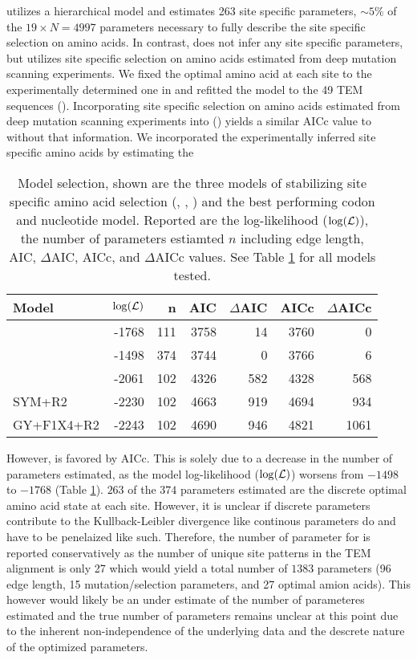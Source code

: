 \selac utilizes a hierarchical model and estimates 263 site specific parameters, $\sim5\%$ of the $19\times N = 4997$ parameters necessary to fully describe the site specific selection on amino acids.
In contrast, \phydms does not infer any site specific parameters, but utilizes site specific selection on amino acids estimated from deep mutation scanning experiments.
We fixed the optimal amino acid at each site to the experimentally determined one in \selac and refitted the model to the 49 TEM sequences (\selacDMS).
Incorporating site specific selection on amino acids estimated from deep mutation scanning experiments into \selac (\selacDMS) yields a similar AICc value to \selac without that information.
We incorporated the experimentally inferred site specific amino acids by estimating the 

\begin{table}
  \centering
  \begin{tabular}{lrrrrrr}
    Model		& $\log(\mathcal{L})$ & n & AIC & $\Delta$AIC & AICc & $\Delta$AICc\\ \hline 
    \selacDMS 		& -1768 & 111& 3758& 14	& 3760  & 0\\
    \selac		& -1498 & 374& 3744&  0	& 3766  & 6 \\
    \phydms 		& -2061 & 102& 4326& 582& 4328 & 568\\
    SYM+R2 		& -2230 & 102& 4663& 919& 4694 & 934 \\
    GY+F1X4+R2 		& -2243 & 102& 4690& 946& 4821 & 1061 \\
  \end{tabular}
  \caption{Model selection, shown are the three models of stabilizing site specific amino acid selection (\selac, \selacDMS, \phydms) and the best performing codon and nucleotide model. 
  Reported are the log-likelihood ($\log(\mathcal{L})$), the number of parameters estiamted $n$ including edge length, AIC, $\Delta$AIC, AICc, and $\Delta$AICc values.
  See Table \ref{tab:AIC} for all models tested.}
  \label{tab:AIC}
\end{table}

However, \selacDMS is favored by AICc.
This is solely due to a decrease in the number of parameters estimated, as the model log-likelihood ($\log(\mathcal{L})$) worsens from $-1498$ to $-1768$ (Table \ref{tab:AIC}).
$263$ of the $374$ parameters estimated are the discrete optimal amino acid state at each site. 
However, it is unclear if discrete parameters contribute to the Kullback-Leibler divergence like continous parameters do and have to be penelaized like such.
Therefore, the number of parameter for \selac is reported conservatively as the number of unique site patterns in the TEM alignment is only 27 which would yield a total number of $1383$ parameters (96 edge length, 15 mutation/selection parameters, and 27 optimal amion acids).
This however would likely be an under estimate of the number of parameteres estimated and the true number of parameters remains unclear at this point due to the inherent non-independence of the underlying data and the descrete nature of the optimized parameters.

